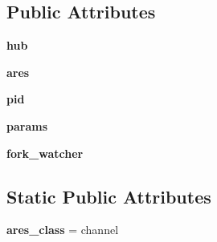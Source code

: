 \subsection*{Public Attributes}
\begin{DoxyCompactItemize}
\item 
\mbox{\label{classgevent_1_1resolver_1_1ares_1_1_resolver_ad1cc803916f6ca279b8c6bdd43d9f387}} 
{\bfseries hub}
\item 
\mbox{\label{classgevent_1_1resolver_1_1ares_1_1_resolver_adf0fd2700dcf2298cf60276bf8f27363}} 
{\bfseries ares}
\item 
\mbox{\label{classgevent_1_1resolver_1_1ares_1_1_resolver_a61b0404a64f5d6fc54d0387475f251ce}} 
{\bfseries pid}
\item 
\mbox{\label{classgevent_1_1resolver_1_1ares_1_1_resolver_ad1c5bcbad86b72b6887122fc35285de4}} 
{\bfseries params}
\item 
\mbox{\label{classgevent_1_1resolver_1_1ares_1_1_resolver_a68e667cbe3a91d069156c49f2297265a}} 
{\bfseries fork\+\_\+watcher}
\end{DoxyCompactItemize}
\subsection*{Static Public Attributes}
\begin{DoxyCompactItemize}
\item 
\mbox{\label{classgevent_1_1resolver_1_1ares_1_1_resolver_a39d87f85bd828464642757cd6503d5e4}} 
{\bfseries ares\+\_\+class} = channel
\end{DoxyCompactItemize}


